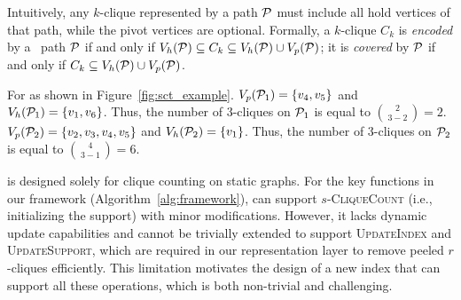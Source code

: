 Intuitively, any $k$-clique represented by a path $\TPath$ must include all hold vertices of that path, while the pivot vertices are optional. 
%
Formally, a $k$-clique $C_k$ is \emph{encoded} by a \cpi\ path $\TPath$ if and only if $V_h(\TPath) \subseteq C_k \subseteq V_h(\TPath) \cup V_p(\TPath)$; 
it is \emph{covered} by $\TPath$ if and only if  $C_k \subseteq V_h(\TPath) \cup V_p(\TPath)$.


\begin{example}
  For \sct as shown in Figure~\ref{fig:sct_example}.
  $V_{p}(\TPath{1}) = \{v_4, v_5\}$ and
  $V_{h}(\TPath{1}) = \{v_1,v_6\}$. Thus, the number of $3$-cliques on $\TPath{1}$ is equal to $ \binom{2}{\,3-2\,} = 2.$ $V_{p}(\TPath{2}) = \{v_2, v_3, v_4, v_5\}$ and $V_{h}(\TPath{2}) = \{v_1\}$. Thus, the number of $3$-cliques on $\TPath{2}$ is equal to $ \binom{4}{\,3-1\,} = 6.$
\end{example}


\sct is designed solely for clique counting on static graphs. 
For the key functions in our framework (Algorithm~\ref{alg:framework}), 
\sct can support \textsc{$s$-CliqueCount} (i.e., initializing the support) with minor modifications. 
However, it lacks dynamic update capabilities and cannot be trivially extended to support \textsc{UpdateIndex} and \textsc{UpdateSupport}, which are required in our representation layer to remove peeled $r$-cliques efficiently. 
%
This limitation motivates the design of a new index that can support all these operations, which is both non-trivial and challenging.




